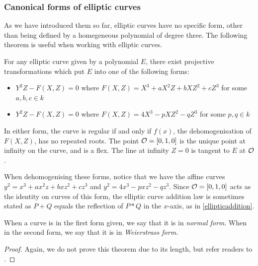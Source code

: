 \subsubsection{Canonical forms of elliptic curves}
As we have introduced them so far, elliptic curves have no specific form, other than being defined by a homegeneous polynomial of degree three.
The following theorem is useful when working with elliptic curves.
\begin{theorem}
	For any elliptic curve given by a polynomial $E$, there exist projective transformations which put $E$ into one of the following forms:
	\begin{itemize}
		\item $Y^2Z - F(X,Z) = 0$ where $F(X,Z) = X^3 + aX^2Z + bXZ^2 + cZ^3$ for some $a,b,c\in k$
		\item $Y^2Z - F(X,Z) = 0$ where $F(X,Z) = 4X^3 - pXZ^2 - qZ^3$ for some $p,q\in k$
	\end{itemize}
	In either form, the curve is regular if and only if $f(x)$, the dehomogenisation of $F(X,Z)$, has no repeated roots.
	The point $\mathcal{O} = [0,1,0]$ is the unique point at infinity on the curve, and is a flex.
	The line at infinity $Z = 0$ is tangent to $E$ at $\mathcal{O}$.
\end{theorem}
When dehomogenising these forms, notice that we have the affine curves $y^2 = x^3 + ax^2z + bxz^2 + cz^3$ and $y^2 = 4x^3 - pxz^2 - qz^3$.
Since $\mathcal{O} = [0,1,0]$ acts as the identity on curves of this form, the elliptic curve addition law is sometimes stated as $P + Q$ equals the reflection of $P * Q$ in the $x$-axis, as in \cref{ellipticaddition}.

When a curve is in the first form given, we say that it is in \emph{normal form}.
When in the second form, we say that it is in \emph{Weierstrass form}.
\begin{proof}
	Again, we do not prove this theorem due to its length, but refer readers to \cite{323-lectures,bix2006}.
\end{proof}
